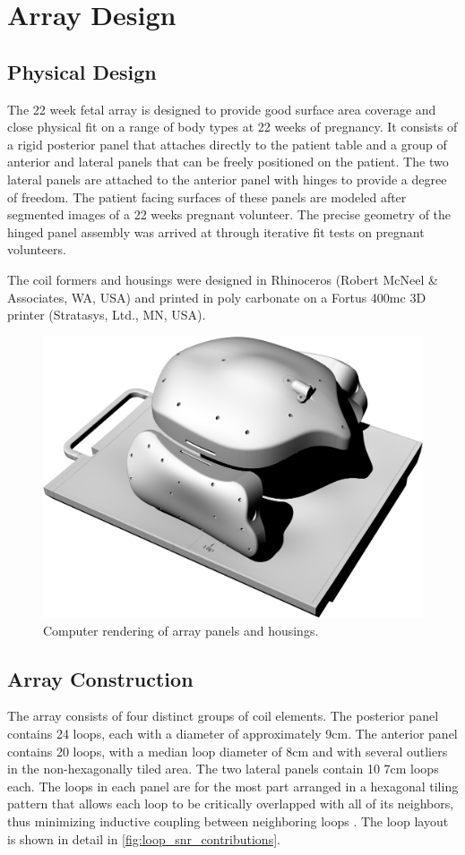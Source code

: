 \chapter{Array Design}
\section{Physical Design}
The 22 week fetal array is designed to provide good surface area coverage and close physical fit on a range of body
types at 22 weeks of pregnancy.  It consists of a rigid posterior panel that attaches directly to the patient table and
a group of anterior and lateral panels that can be freely positioned on the patient. The two lateral panels are attached
to the anterior panel with hinges to provide a degree of freedom. The patient facing surfaces of these panels are
modeled after segmented images of a 22 weeks pregnant volunteer. The precise geometry of the hinged panel assembly was
arrived at through iterative fit tests on pregnant volunteers.
 
The coil formers and housings were designed in Rhinoceros (Robert McNeel \& Associates, WA, USA) and printed in
poly carbonate on a Fortus 400mc 3D printer (Stratasys, Ltd., MN, USA).

\begin{figure}
\includegraphics[width=6in]{figures/cad_rendering.png}
\caption{Computer rendering of array panels and housings.}
\label{fig:cad_rendering}
\end{figure}

\section{Array Construction}
The array consists of four distinct groups of coil elements. The posterior panel contains 24 loops, each with a diameter
of approximately 9cm. The anterior panel contains 20 loops, with a median loop diameter of 8cm and with several outliers
in the non-hexagonally tiled area. The two lateral panels contain 10 7cm loops each. The loops in each panel are for
the most part arranged in a hexagonal tiling pattern that allows each loop to be critically overlapped with all of its
neighbors,  thus minimizing inductive coupling between neighboring loops \cite{Roemer90}. The loop layout is shown in
detail in \ref{fig:loop_snr_contributions}.

